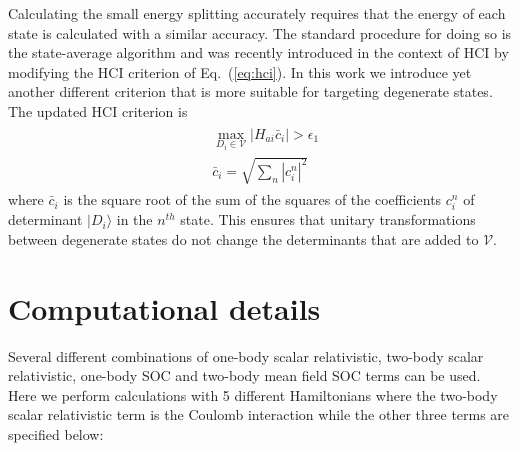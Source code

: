 \documentclass[10pt,aps,prb,twocolumn,amsmath,amssymb,superscriptaddress]{revtex4-1}
\begin{document}
Calculating the small energy splitting accurately requires that the energy of each state is calculated with a similar accuracy. The standard procedure for doing so is the state-average algorithm and was recently introduced in the context of HCI by modifying the HCI criterion of Eq.~(\ref{eq:hci})\cite{holm17}. In this work we introduce yet another different criterion that is more suitable for targeting degenerate states. The updated HCI criterion is 
\begin{align}
    \begin{array}{ll}
        &\max_{D_i \in \mathcal{V}} \left| H_{ai} \bar{c}_{i}\right| > \epsilon_1\\[.7em]
        &\bar{c}_{i} = \sqrt{\sum_{n} \left|c_{i}^n\right|^2}
    \end{array}
\label{eq:hciecited}
\end{align}
where $\bar{c}_{i}$ is the square root of the sum of the squares of the coefficients $c_{i}^n$ of determinant $|D_i\rangle$ in the $n^{th}$ state. This ensures that unitary transformations between degenerate states do not change the determinants that are added to $\mathcal{V}$.

\section{Computational details}\label{sec:comp}

Several different combinations of one-body scalar relativistic, two-body scalar relativistic, one-body SOC and two-body mean field SOC terms can be used. Here we perform calculations with 5 different Hamiltonians where the two-body scalar relativistic term is the Coulomb interaction while the other three terms are specified below: 
\end{document}
